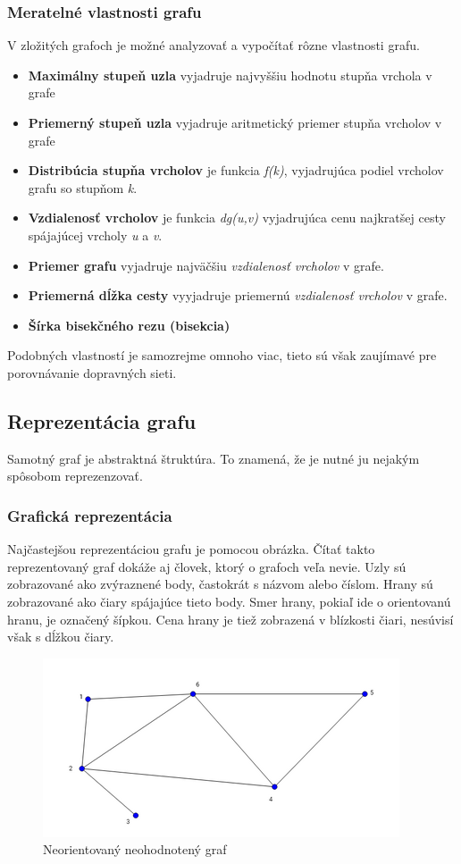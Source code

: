 \documentclass[12pt,twoside,slovak,a4paper]{article}
\begin{document}
\subsubsection{Meratelné vlastnosti grafu}
V zložitých grafoch je možné analyzovať a vypočítať rôzne vlastnosti grafu. 
\begin{itemize}
\item \textbf{Maximálny stupeň uzla} vyjadruje najvyššiu hodnotu stupňa vrchola v grafe
\item \textbf{Priemerný stupeň uzla} vyjadruje aritmetický priemer stupňa vrcholov v grafe
\item \textbf{Distribúcia stupňa vrcholov} je funkcia \emph{f(k)}, vyjadrujúca podiel vrcholov grafu so stupňom \emph{k}.
\item \textbf{Vzdialenosť vrcholov} je funkcia \emph{dg(u,v)} vyjadrujúca cenu najkratšej cesty spájajúcej vrcholy \emph{u} a \emph{v}.
\item \textbf{Priemer grafu} vyjadruje najväčšiu \emph{vzdialenosť vrcholov} v grafe.
\item \textbf{Priemerná dĺžka cesty} vyyjadruje priemernú \emph{vzdialenosť vrcholov} v grafe.

\item \textbf{Šírka bisekčného rezu (bisekcia)} 

\end{itemize}
Podobných vlastností je samozrejme omnoho viac, tieto sú však zaujímavé pre porovnávanie dopravných sieti.
	\subsection{Reprezentácia grafu}
	Samotný graf je abstraktná štruktúra. To znamená, že je nutné ju nejakým spôsobom reprezenzovať.
	\subsubsection{Grafická reprezentácia}
	Najčastejšou reprezentáciou grafu je pomocou obrázka. Čítať takto reprezentovaný graf dokáže aj človek, ktorý o grafoch veľa nevie. Uzly sú zobrazované ako zvýraznené body, častokrát s názvom alebo číslom. Hrany sú zobrazované ako čiary spájajúce tieto body. Smer hrany, pokiaľ ide o orientovanú hranu, je označený šípkou. Cena hrany je tiež zobrazená v blízkosti čiari, nesúvisí však s dĺžkou čiary.
	
	\begin{figure}[H]
 	 \caption{Neorientovaný neohodnotený graf}
 	 \centering
	 \includegraphics{neorientovany_small}
 \end{figure}
 
\end{document}
